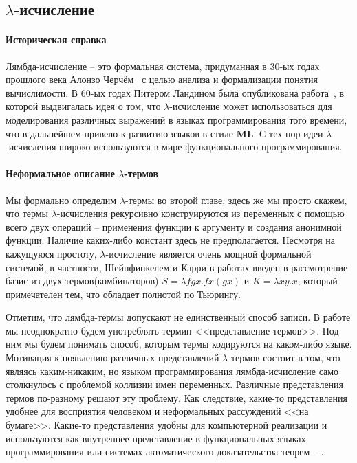 \subsection{\texorpdfstring{$\lambda$}{Лямбда}-исчисление}
\label{sec:lambda}

\paragraph{Историческая справка}
Лямбда-исчисление -- это формальная система, придуманная в 30-ых годах прошлого века Алонзо Черчём~\cite{church1936unsolvable} с целью анализа и формализации понятия вычислимости. В 60-ых годах Питером Ландином была опубликована работа~\cite{landin1964mechanical}, в которой выдвигалась идея о том, что $\lambda$-исчисление может использоваться для моделирования различных выражений в языках программирования того времени, что в дальнейшем привело к развитию языков в стиле \textbf{ML}. С тех пор идеи $\lambda$-исчисления широко используются в мире функционального программирования.

\paragraph{Неформальное описание $\lambda$-термов}
Мы формально определим $\lambda$-термы во второй главе, здесь же мы просто скажем, что термы $\lambda$-исчисления рекурсивно конструируются из переменных с помощью всего двух операций -- применения функции к аргументу и создания анонимной функции. Наличие каких-либо констант здесь не предполагается. Несмотря на кажущуюся простоту, $\lambda$-исчисление является очень мощной формальной системой, в частности, Шейнфинкелем и Карри в работах \cite{schonfinkel1924bausteine, curry1930grundlagen} введен в рассмотрение базис из двух термов(комбинаторов) $S = \lambda f g x. f x (g x)$ и $K = \lambda x y. x$, который примечателен тем, что обладает полнотой по Тьюрингу.

Отметим, что лямбда-термы допускают не единственный способ записи. В работе мы неоднократно будем употреблять термин <<представление термов>>. Под ним мы будем понимать способ, которым термы кодируются на каком-либо языке. Мотивация к появлению различных представлений $\lambda$-термов состоит в том, что являясь каким-никаким, но языком программирования лямбда-исчисление само столкнулось с проблемой коллизии имен переменных. Различные представления термов по-разному решают эту проблему. Как следствие, какие-то представления удобнее для восприятия человеком и неформальных рассуждений <<на бумаге>>. Какие-то представления удобны для компьютерной реализации и используются как внутреннее представление в функциональных языках программирования или системах автоматического доказательства теорем -- \cite{norell2007towards}.
